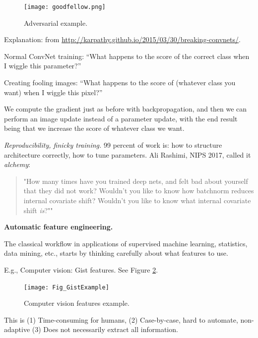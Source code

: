 \documentclass[english]{article}
\begin{document}
\begin{figure}
  \centering
  \texttt{[image: goodfellow.png]}
  \caption{Adversarial example.}
  \label{adv}
\end{figure}

Explanation: from \url{http://karpathy.github.io/2015/03/30/breaking-convnets/}.

Normal ConvNet training: “What happens to the score of the correct class when I wiggle this parameter?”

Creating fooling images: “What happens to the score of (whatever class you want) when I wiggle this pixel?”

We compute the gradient just as before with backpropagation, and then we can perform an image update instead of a parameter update, with the end result being that we increase the score of whatever class we want. 

\item

\emph{Reproducibility, finicky training.}   99 percent of work is: how to structure architecture correctly, how to tune parameters. Ali Rashimi, NIPS 2017, called it \emph{alchemy}: 

\begin{quote}
"How many times have you trained deep nets, and felt bad about yourself that they did not work? Wouldn't you like to know how batchnorm reduces internal covariate shift? Wouldn't you like to know what internal covariate shift \emph{is}?""
\end{quote}

\eenum


\item {\bf Automatic feature engineering.}

\benum 
\item The classical workflow in applications of supervised machine learning, statistics, data mining, etc., starts by thinking carefully about what features to use. 

E.g., Computer vision: Gist features. See Figure \ref{cv}.

\begin{figure}
  \centering
  \texttt{[image: Fig\_GistExample]}
  \caption{Computer vision features example.}
  \label{cv}
\end{figure}

\item This is (1) Time-consuming for humans, (2) Case-by-case, hard to automate, non-adaptive (3) Does not necessarily extract all information.
\end{document}
